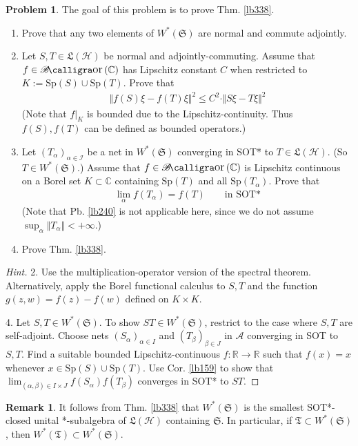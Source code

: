 \documentclass[12pt,b5paper,notitlepage]{article}
\theoremstyle{definition}
\newtheorem{rem}[df]{Remark}
\newtheorem{prob}{\color{red}Problem}[section]
\theoremstyle{plain}
\DeclareMathOperator{\Bor}{\mathscr{B}\text{\kern -2pt {\calligra\large or}}\,}
\newcommand{\fk}{\mathfrak}
\newcommand{\Cbb}{\mathbb C}
\newcommand{\Rbb}{\mathbb R}
\newcommand{\Sp}{\mathrm{Sp}}
\newcommand{\MH}{\mathcal H}
\newcommand{\SI}{\mathscr I}
\newcommand{\SA}{\mathscr A}
\numberwithin{equation}{section}
\begin{document}
\begin{prob}\label{lb341}
The goal of this problem is to prove Thm. \ref{lb338}.
\begin{enumerate}
\item Prove that any two elements of $W^*(\fk S)$ are normal and commute adjointly.
\item Let $S,T\in\fk L(\MH)$ be normal and adjointly-commuting. Assume that $f\in\Bor(\Cbb)$ has Lipschitz constant $C$ when restricted to $K:=\Sp(S)\cup\Sp(T)$. Prove that
\begin{align*}
\Vert f(S)\xi-f(T)\xi\Vert^2\leq C^2\cdot\Vert S\xi-T\xi\Vert^2
\end{align*}
(Note that $f|_K$ is bounded due to the Lipschitz-continuity. Thus $f(S),f(T)$ can be defined as bounded operators.)
\item Let $(T_\alpha)_{\alpha\in\SI}$ be a net in $W^*(\fk S)$ converging in SOT* to $T\in\fk L(\MH)$. (So $T\in W^*(\fk S)$.) Assume that $f\in\Bor(\Cbb)$ is Lipschitz continuous on a Borel set $K\subset\Cbb$ containing $\Sp(T)$ and all $\Sp(T_\alpha)$. Prove that 
\begin{align*}
\lim_\alpha f(T_\alpha)=f(T)\qquad\text{in SOT*}
\end{align*}
(Note that Pb. \ref{lb240} is not applicable here, since we do not assume $\sup_\alpha\Vert T_\alpha\Vert<+\infty$.)
\item Prove Thm. \ref{lb338}.
\end{enumerate}
\end{prob}


\begin{proof}[Hint]
2. Use the multiplication-operator version of the spectral theorem. Alternatively, apply the Borel functional calculus to $S,T$ and the function $g(z,w)=f(z)-f(w)$ defined on $K\times K$.

4. Let $S,T\in W^*(\fk S)$. To show $ST\in W^*(\fk S)$, restrict to the case where $S,T$ are self-adjoint. Choose nets $(S_\alpha)_{\alpha \in I}$ and $(T_\beta)_{\beta\in J}$ in $\SA$ converging in SOT to $S,T$. Find a suitable bounded Lipschitz-continuous $f:\Rbb\rightarrow\Rbb$ such that $f(x)=x$ whenever $x\in\Sp(S)\cup \Sp(T)$. Use Cor. \ref{lb159} to show that $\lim_{(\alpha,\beta)\in I\times J}f(S_\alpha)f(T_\beta)$ converges in SOT* to $ST$.
\end{proof}


\begin{rem}
It follows from Thm. \ref{lb338} that $W^*(\fk S)$ is the smallest SOT*-closed unital *-subalgebra of $\fk L(\MH)$ containing $\fk S$. In particular, if $\fk T\subset W^*(\fk S)$, then $W^*(\fk T)\subset W^*(\fk S)$.
\end{rem}
\end{document}
